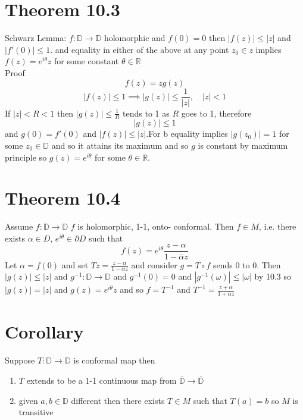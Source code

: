 \documentclass[11pt]{article}
\begin{document}
\section{Theorem 10.3}
Schwarz Lemma:
$f : \mathbb{D} \rightarrow \mathbb{D}$ holomorphic and $f(0) = 0$  then  $|f(z)| \le |z|$ and  $|f'(0)| \le 1$.
and equality in either of the above at any point $z_0 \in z$ implies $f(z) = e^{i \theta}z$ for some constant $\theta \in \mathbb{R}$\\
Proof
\[
f(z) = zg(z)
\] 
\[
|f(z)| \le 1 \implies |g(z)| \le \frac{1}{|z|} , \quad |z| < 1
\] 
If $|z| < R < 1$ then $|g(z)| \le \frac{1}{R}$ tends to 1 as $R$ goes to 1,
therefore
 \[
|g(z)| \le 1
\] 
and $g(0) = f'(0)$ and  $|f(z)| \le |z|$.For b equality implies  $|g(z_0)| = 1$ for some $z_0 \in \mathbb{D}$
and so it attains its maximum and so $g$ is constant by maximum principle so  $g(z) = e^{i\theta}$ for some $\theta \in \mathbb{R}$.

\section{Theorem 10.4}
Assume $f : \mathbb{D} \to \mathbb{D}$  $f$ is holomorphic, 1-1, onto- conformal.
Then $f \in M$, i.e. there exists  $\alpha \in D$, $e^{i\theta} \in \partial D$ such that
\[
f(z) = e^{i\theta} \frac{z-\alpha}{1-\overline{\alpha}z}
\] 
Let $\alpha = f(0)$ and set $Tz = \frac{z-\alpha}{1-\overline{\alpha}z}$ and consider $g = T \circ f$ sends  $ 0$ to 0.
Then $|g(z)| \le |z|$ and  $g^{-1} : \mathbb{D} \to \mathbb{D}$ and $g^{-1}(0) = 0$ and
$|g^{-1}(\omega)| \le |\omega|$ by 10.3 so $|g(z)| = |z|$ and  $g(z) = e^{i\theta}z$ 
and so $f = T^{-1}$ and  $ T^{-1} = \frac{z + \alpha}{1 + \overline{\alpha}z}$

\section{Corollary}
Suppose $T: \mathbb{D} \to \mathbb{D}$ is conformal map then
 \begin{enumerate}
     \item $T$ extends to be a 1-1 continuous map from $\overline{ \mathbb{D}} \to \overline{\mathbb{D}}$ 
     \item given $a,b \in \mathbb{D}$ different then there exists  $T \in M$ such that  $T(a) = b$ so  $M$ is transitive
\end{enumerate}
\end{document}
